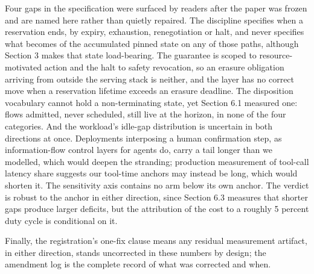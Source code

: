 Four gaps in the specification were surfaced by readers after the paper
was frozen and are named here rather than quietly repaired. The
discipline specifies when a reservation ends, by expiry, exhaustion,
renegotiation or halt, and never specifies what becomes of the
accumulated pinned state on any of those paths, although Section 3 makes
that state load-bearing. The guarantee is scoped to resource-motivated
action and the halt to safety revocation, so an erasure obligation
arriving from outside the serving stack is neither, and the layer has no
correct move when a reservation lifetime exceeds an erasure deadline.
The disposition vocabulary cannot hold a non-terminating state, yet
Section 6.1 measured one: flows admitted, never scheduled, still live at
the horizon, in none of the four categories. And the workload's idle-gap
distribution is uncertain in both directions at once. Deployments
interposing a human confirmation step, as information-flow control
layers for agents do, carry a tail longer than we modelled, which would
deepen the stranding; production measurement of tool-call latency share
\citep{sutradhara2026} suggests our tool-time anchors may instead be long,
which would shorten it. The sensitivity axis contains no arm below its
own anchor. The verdict is robust to the anchor in either direction,
since Section 6.3 measures that shorter gaps produce larger deficits,
but the attribution of the cost to a roughly 5 percent duty cycle is
conditional on it.

Finally, the
registration's one-fix clause means any residual measurement artifact, in
either direction, stands uncorrected in these numbers by design; the
amendment log is the complete record of what was corrected and when.
